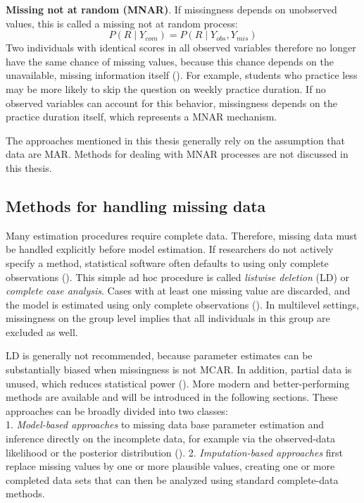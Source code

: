 \documentclass[
  letterpaper,
  11pt,
  english,
  singlespacing,
  headsepline,
  openany]{MastersDoctoralThesis}
\begin{document}
\textbf{Missing not at random (MNAR)}. If missingness depends on
unobserved values, this is called a missing not at random process: \[
P(R \mid Y_{com}) = P (R \mid Y_{obs}, Y_{mis})
\] Two individuals with identical scores in all observed variables
therefore no longer have the same chance of missing values, because this
chance depends on the unavailable, missing information itself
(). For example, students
who practice less may be more likely to skip the question on weekly
practice duration. If no observed variables can account for this
behavior, missingness depends on the practice duration itself, which
represents a MNAR mechanism.

The approaches mentioned in this thesis generally rely on the assumption
that data are MAR. Methods for dealing with MNAR processes are not
discussed in this thesis.

\subsection{Methods for handling missing
data}\label{methods-for-handling-missing-data}

Many estimation procedures require complete data. Therefore, missing
data must be handled explicitly before model estimation. If researchers
do not actively specify a method, statistical software often defaults to
using only complete observations (). This simple ad hoc procedure is called \emph{listwise deletion}
(LD) or \emph{complete case analysis}. Cases with at least one missing
value are discarded, and the model is estimated using only complete
observations (). In multilevel
settings, missingness on the group level implies that all individuals in
this group are excluded as well.

LD is generally not recommended, because parameter estimates can be
substantially biased when missingness is not MCAR. In addition, partial
data is unused, which reduces statistical power
(). More modern and
better-performing methods are available and will be introduced in the
following sections. These approaches can be broadly divided into two
classes:\\
1. \emph{Model-based approaches} to missing data base parameter
estimation and inference directly on the incomplete data, for example
via the observed-data likelihood or the posterior distribution
(). 2.
\emph{Imputation-based approaches} first replace missing values by one
or more plausible values, creating one or more completed data sets that
can then be analyzed using standard complete-data methods.
\end{document}
